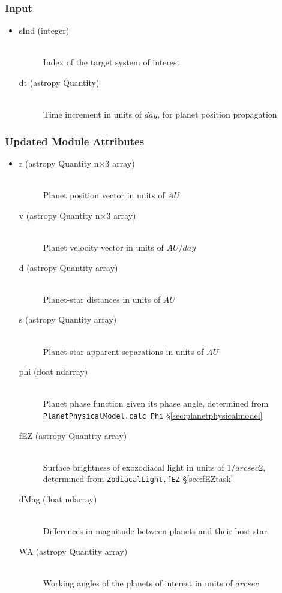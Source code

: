 \documentclass[cleanfoot]{asme2ej}
\begin{document}
\subsubsection*{Input}
\begin{itemize}
\item 
\begin{description}
    \item[sInd (integer)] \hfill \\ Index of the target system of interest
    \item[dt (astropy Quantity)] \hfill \\ Time increment in units of $day$, for planet position propagation
\end{description}
\end{itemize}

\subsubsection*{Updated Module Attributes}
\begin{itemize}
\item 
\begin{description}
    \item[r (astropy Quantity n$\times$3 array)] \hfill \\ Planet position vector in units of $ AU $
    \item[v (astropy Quantity n$\times$3 array)] \hfill \\ Planet velocity vector in units of $ AU/day $
    \item[d (astropy Quantity array)] \hfill \\ Planet-star distances in units of $ AU $
    \item[s (astropy Quantity array)] \hfill \\ Planet-star apparent separations in units of $ AU $
    \item[phi (float ndarray)] \hfill \\ Planet phase function given its phase angle, determined from \verb+PlanetPhysicalModel.calc_Phi+ \S\ref{sec:planetphysicalmodel}
    \item[fEZ (astropy Quantity array)] \hfill \\ Surface brightness of exozodiacal light in units of $ 1/arcsec2 $, determined from \verb+ZodiacalLight.fEZ+ \S\ref{sec:fEZtask}
    \item[dMag (float ndarray)] \hfill \\ Differences in magnitude between planets and their host star
    \item[WA (astropy Quantity array)] \hfill \\ Working angles of the planets of interest in units of $arcsec$
\end{description}
\end{itemize}
\end{document}
